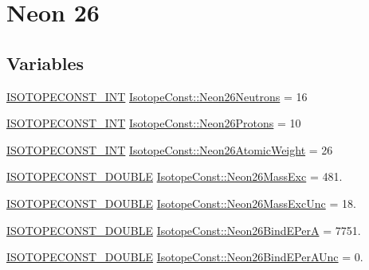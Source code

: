 \hypertarget{group___isotope_const-_neon-_ne26}{}\section{Neon 26}
\label{group___isotope_const-_neon-_ne26}
\subsection*{Variables}
\begin{DoxyCompactItemize}
\item 
\mbox{\hyperlink{group___isotope_const-_macros_ga5f18360b3e99483a35c32d789e62621c}{I\+S\+O\+T\+O\+P\+E\+C\+O\+N\+S\+T\+\_\+\+I\+NT}} \mbox{\hyperlink{group___isotope_const-_neon-_ne26_ga27ed594bb7a4234604b501fed661d27a}{Isotope\+Const\+::\+Neon26\+Neutrons}} = 16
\item 
\mbox{\hyperlink{group___isotope_const-_macros_ga5f18360b3e99483a35c32d789e62621c}{I\+S\+O\+T\+O\+P\+E\+C\+O\+N\+S\+T\+\_\+\+I\+NT}} \mbox{\hyperlink{group___isotope_const-_neon-_ne26_ga7fe6fa8f075f192ab70aa939f91c5d00}{Isotope\+Const\+::\+Neon26\+Protons}} = 10
\item 
\mbox{\hyperlink{group___isotope_const-_macros_ga5f18360b3e99483a35c32d789e62621c}{I\+S\+O\+T\+O\+P\+E\+C\+O\+N\+S\+T\+\_\+\+I\+NT}} \mbox{\hyperlink{group___isotope_const-_neon-_ne26_ga286813b960167fd80d302d0dfb443df2}{Isotope\+Const\+::\+Neon26\+Atomic\+Weight}} = 26
\item 
\mbox{\hyperlink{group___isotope_const-_macros_ga8f45a7272ce02c0b4c65c44636ed719a}{I\+S\+O\+T\+O\+P\+E\+C\+O\+N\+S\+T\+\_\+\+D\+O\+U\+B\+LE}} \mbox{\hyperlink{group___isotope_const-_neon-_ne26_gada2ded32714a05a701b9189ebb72b60b}{Isotope\+Const\+::\+Neon26\+Mass\+Exc}} = 481.
\item 
\mbox{\hyperlink{group___isotope_const-_macros_ga8f45a7272ce02c0b4c65c44636ed719a}{I\+S\+O\+T\+O\+P\+E\+C\+O\+N\+S\+T\+\_\+\+D\+O\+U\+B\+LE}} \mbox{\hyperlink{group___isotope_const-_neon-_ne26_ga99ec245c8a75f03c9b1c1c80b4196aae}{Isotope\+Const\+::\+Neon26\+Mass\+Exc\+Unc}} = 18.
\item 
\mbox{\hyperlink{group___isotope_const-_macros_ga8f45a7272ce02c0b4c65c44636ed719a}{I\+S\+O\+T\+O\+P\+E\+C\+O\+N\+S\+T\+\_\+\+D\+O\+U\+B\+LE}} \mbox{\hyperlink{group___isotope_const-_neon-_ne26_gaf8e988ccc4d2147314814a69253e586f}{Isotope\+Const\+::\+Neon26\+Bind\+E\+PerA}} = 7751.
\item 
\mbox{\hyperlink{group___isotope_const-_macros_ga8f45a7272ce02c0b4c65c44636ed719a}{I\+S\+O\+T\+O\+P\+E\+C\+O\+N\+S\+T\+\_\+\+D\+O\+U\+B\+LE}} \mbox{\hyperlink{group___isotope_const-_neon-_ne26_gaf80903ba7a34d8a8f3b053af07f36af5}{Isotope\+Const\+::\+Neon26\+Bind\+E\+Per\+A\+Unc}} = 0.

\end{DoxyCompactItemize}
